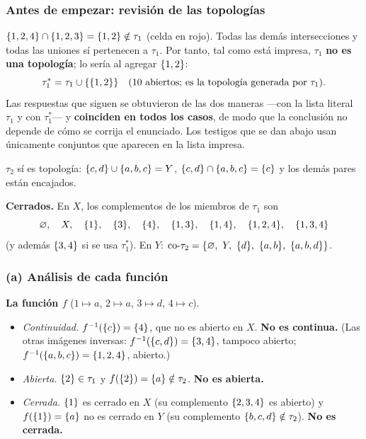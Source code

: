 \subsubsection*{Antes de empezar: revisión de las topologías}
\begin{center}{\scriptsize\renewcommand{\arraystretch}{1.2}\setlength{\tabcolsep}{3.5pt}}\end{center}
\begin{ojo}
$\{1,2,4\}\cap\{1,2,3\}=\{1,2\}\notin\tau_1$ (celda en rojo). Todas las demás intersecciones y todas las uniones sí
pertenecen a $\tau_1$. Por tanto, tal como está impresa, $\tau_1$ \textbf{no es una topología}; lo sería al agregar
$\{1,2\}$:
\[\tau_1^{*}=\tau_1\cup\{\{1,2\}\}\quad(\text{10 abiertos; es la topología generada por }\tau_1).\]
Las respuestas que siguen se obtuvieron de las dos maneras —con la lista literal $\tau_1$ y con $\tau_1^{*}$— y
\textbf{coinciden en todos los casos}, de modo que la conclusión no depende de cómo se corrija el enunciado. Los
testigos que se dan abajo usan únicamente conjuntos que aparecen en la lista impresa.
\end{ojo}
$\tau_2$ sí es topología: $\{c,d\}\cup\{a,b,c\}=Y$, $\{c,d\}\cap\{a,b,c\}=\{c\}$ y los demás pares están encajados.

\textbf{Cerrados.} En $X$, los complementos de los miembros de $\tau_1$ son
\[\varnothing,\quad X,\quad \{1\},\quad \{3\},\quad \{4\},\quad \{1,3\},\quad \{1,4\},\quad \{1,2,4\},\quad \{1,3,4\}\]
(y además $\{3,4\}$ si se usa $\tau_1^{*}$). En $Y$: $\co{\tau_2}=\{\vac,\ Y,\ \s{d},\ \s{a,b},\ \s{a,b,d}\}$.

\subsubsection*{(a) Análisis de cada función}
\textbf{La función $f$} ($1\mapsto a$, $2\mapsto a$, $3\mapsto d$, $4\mapsto c$).
\begin{itemize}
\item \emph{Continuidad.} $f^{-1}(\{c\})=\{4\}$, que no es abierto en $X$. \textbf{No es continua.}
(Las otras imágenes inversas: $f^{-1}(\{c,d\})=\{3,4\}$, tampoco abierto; $f^{-1}(\{a,b,c\})=\{1,2,4\}$, abierto.)
\item \emph{Abierta.} $\{2\}\in\tau_1$ y $f(\{2\})=\{a\}\notin\tau_2$. \textbf{No es abierta.}
\item \emph{Cerrada.} $\{1\}$ es cerrado en $X$ (su complemento $\{2,3,4\}$ es abierto) y $f(\{1\})=\{a\}$ no es
cerrado en $Y$ (su complemento $\{b,c,d\}\notin\tau_2$). \textbf{No es cerrada.}
\end{itemize}

